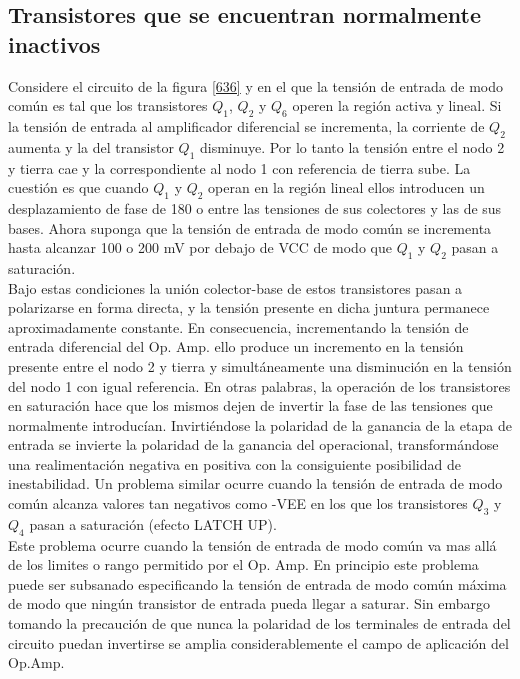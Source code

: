 \documentclass[12pt,a4paper,final,headinclude,footinclude,BCOR5mm]{scrartcl}
\begin{document}
\subsection{Transistores que se encuentran normalmente inactivos}

Considere el circuito de la figura \ref{636} y en el que la tensión de entrada de modo común es tal que los transistores $Q_{1}$, $Q_{2}$ y $Q_{6}$ operen la región activa y lineal. Si la tensión  de entrada al amplificador diferencial se incrementa, la corriente de $Q_{2}$ aumenta y la del transistor $Q_{1}$ disminuye. Por lo tanto la tensión entre el nodo 2 y tierra cae y la correspondiente al nodo 1 con referencia de tierra sube. La cuestión es que cuando $Q_{1}$ y $Q_{2}$ operan en la región lineal ellos introducen un desplazamiento de fase de 180 o entre las tensiones de sus colectores y las de sus bases. Ahora suponga que la tensión de entrada de modo común se incrementa hasta alcanzar 100 o 200 mV por debajo de VCC de modo que $Q_{1}$ y $Q_{2}$ pasan a saturación.\\

Bajo estas condiciones la unión colector-base de estos transistores pasan a polarizarse en forma directa, y la tensión presente en dicha juntura permanece aproximadamente constante. En consecuencia, incrementando la tensión de entrada diferencial del Op. Amp. ello produce un incremento en la tensión presente entre el nodo 2 y tierra y simultáneamente una disminución en la tensión del nodo 1 con igual referencia. En otras palabras, la operación de los transistores en saturación hace que los mismos dejen de invertir la fase de las tensiones que normalmente introducían. Invirtiéndose la polaridad de la ganancia de la etapa de entrada se invierte la polaridad de la ganancia del operacional, transformándose una realimentación negativa en positiva con la consiguiente posibilidad de inestabilidad. Un problema similar ocurre cuando la tensión de entrada de modo común alcanza valores tan negativos como -VEE en los que los transistores $Q_{3}$ y $Q_{4}$ pasan a saturación (efecto LATCH UP).\\

Este problema ocurre cuando la tensión de entrada de modo común va mas allá de los limites o rango permitido por el Op. Amp. En principio este problema puede ser subsanado especificando la tensión de entrada de modo común máxima de modo que ningún transistor de entrada pueda llegar a saturar. Sin embargo tomando la precaución de que nunca la polaridad de los terminales de entrada del circuito puedan invertirse se amplia considerablemente el campo de aplicación del Op.Amp.\\
\end{document}
